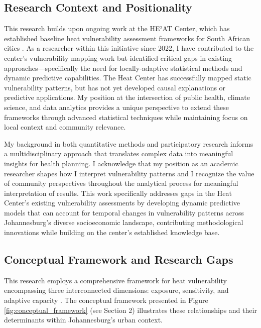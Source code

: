 \subsection{Research Context and Positionality}
This research builds upon ongoing work at the HE²AT Center, which has established baseline heat vulnerability assessment frameworks for South African cities \citep{Jack}. As a researcher within this initiative since 2022, I have contributed to the center's vulnerability mapping work but identified critical gaps in existing approaches—specifically the need for locally-adaptive statistical methods and dynamic predictive capabilities. The Heat Center has successfully mapped static vulnerability patterns, but has not yet developed causal explanations or predictive applications. My position at the intersection of public health, climate science, and data analytics provides a unique perspective to extend these frameworks through advanced statistical techniques while maintaining focus on local context and community relevance.

My background in both quantitative methods and participatory research informs a multidisciplinary approach that translates complex data into meaningful insights for health planning. I acknowledge that my position as an academic researcher shapes how I interpret vulnerability patterns and I recognize the value of community perspectives throughout the analytical process for meaningful interpretation of results. This work specifically addresses gaps in the Heat Center's existing vulnerability assessments by developing dynamic predictive models that can account for temporal changes in vulnerability patterns across Johannesburg's diverse socioeconomic landscape, contributing methodological innovations while building on the center's established knowledge base.

\subsection{Conceptual Framework and Research Gaps}

This research employs a comprehensive framework for heat vulnerability encompassing three interconnected dimensions: exposure, sensitivity, and adaptive capacity \citep{IPCC2022}. The conceptual framework presented in Figure \ref{fig:conceptual_framework} (see Section 2) illustrates these relationships and their determinants within Johannesburg's urban context.

